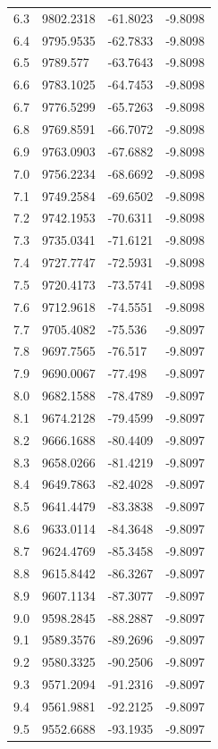 \begin{table}[H]
\begin{tabular}{llll}
6.3 & 9802.2318 & -61.8023 & -9.8098 \\
6.4 & 9795.9535 & -62.7833 & -9.8098 \\
6.5 & 9789.577 & -63.7643 & -9.8098 \\
6.6 & 9783.1025 & -64.7453 & -9.8098 \\
6.7 & 9776.5299 & -65.7263 & -9.8098 \\
6.8 & 9769.8591 & -66.7072 & -9.8098 \\
6.9 & 9763.0903 & -67.6882 & -9.8098 \\
7.0 & 9756.2234 & -68.6692 & -9.8098 \\
7.1 & 9749.2584 & -69.6502 & -9.8098 \\
7.2 & 9742.1953 & -70.6311 & -9.8098 \\
7.3 & 9735.0341 & -71.6121 & -9.8098 \\
7.4 & 9727.7747 & -72.5931 & -9.8098 \\
7.5 & 9720.4173 & -73.5741 & -9.8098 \\
7.6 & 9712.9618 & -74.5551 & -9.8098 \\
7.7 & 9705.4082 & -75.536 & -9.8097 \\
7.8 & 9697.7565 & -76.517 & -9.8097 \\
7.9 & 9690.0067 & -77.498 & -9.8097 \\
8.0 & 9682.1588 & -78.4789 & -9.8097 \\
8.1 & 9674.2128 & -79.4599 & -9.8097 \\
8.2 & 9666.1688 & -80.4409 & -9.8097 \\
8.3 & 9658.0266 & -81.4219 & -9.8097 \\
8.4 & 9649.7863 & -82.4028 & -9.8097 \\
8.5 & 9641.4479 & -83.3838 & -9.8097 \\
8.6 & 9633.0114 & -84.3648 & -9.8097 \\
8.7 & 9624.4769 & -85.3458 & -9.8097 \\
8.8 & 9615.8442 & -86.3267 & -9.8097 \\
8.9 & 9607.1134 & -87.3077 & -9.8097 \\
9.0 & 9598.2845 & -88.2887 & -9.8097 \\
9.1 & 9589.3576 & -89.2696 & -9.8097 \\
9.2 & 9580.3325 & -90.2506 & -9.8097 \\
9.3 & 9571.2094 & -91.2316 & -9.8097 \\
9.4 & 9561.9881 & -92.2125 & -9.8097 \\
9.5 & 9552.6688 & -93.1935 & -9.8097 \\

\end{tabular}
\end{table}
